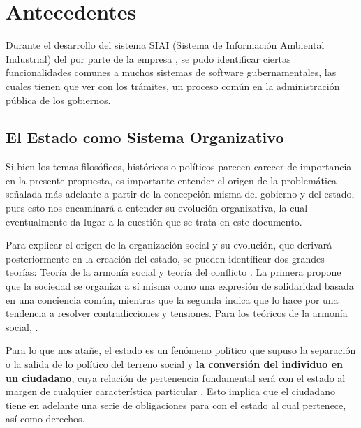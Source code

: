 \section{Antecedentes}

Durante el desarrollo del sistema SIAI (Sistema de Información Ambiental Industrial) del  por parte de la empresa ,
se pudo identificar ciertas funcionalidades comunes a muchos sistemas de software gubernamentales,
las cuales tienen que ver con los trámites, un proceso común en la administración pública de los gobiernos.

\subsection{El Estado como Sistema Organizativo}

Si bien los temas filosóficos, históricos o políticos parecen carecer de importancia en la presente propuesta,
es importante entender el origen de la problemática señalada más adelante a partir de la concepción misma del gobierno y del estado, pues esto nos encaminará a entender su evolución organizativa,
la cual eventualmente da lugar a la cuestión que se trata en este documento.

Para explicar el origen de la organización social y su evolución, que derivará posteriormente en la creación del estado, se pueden identificar dos grandes teorías: 
Teoría de la armonía social y teoría del conflicto \cite{vacarofernandezOrigenEstado2000}. 
La primera propone que la sociedad se organiza a sí misma como una expresión de solidaridad basada en una conciencia común, 
mientras que la segunda indica que lo hace por una tendencia a resolver contradicciones y tensiones. 
Para los teóricos de la armonía social, \cite[3]{vacarofernandezOrigenEstado2000}.

Para lo que nos atañe, el estado es un fenómeno político que supuso la separación o la salida de lo político del terreno social y 
\textbf{la conversión del individuo en un ciudadano}, cuya relación de pertenencia fundamental será con el estado al margen de cualquier característica particular \cite{gordilloperezPorQueSurge2017}.
Esto implica que el ciudadano tiene en adelante una serie de obligaciones para con el estado al cual pertenece, así como derechos.

